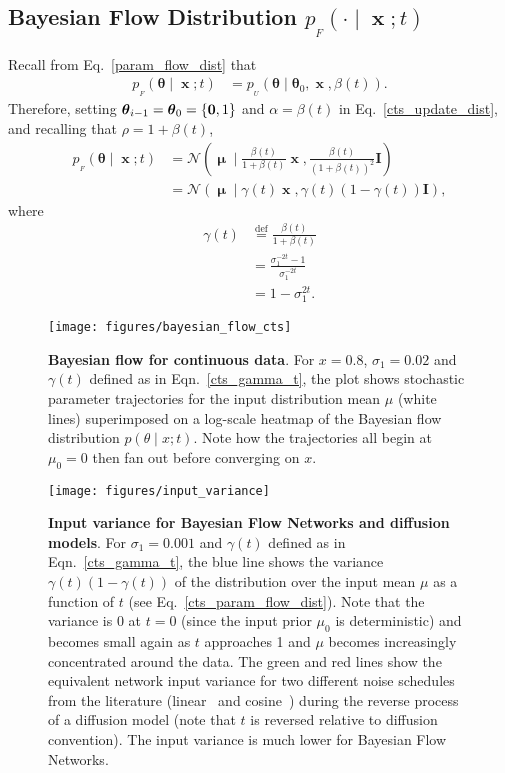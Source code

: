 \documentclass[11pt,table]{article}
\DeclareMathOperator{\x}{\mathbf{x}}
\DeclareMathOperator{\m}{\boldsymbol{\mu}}
\newcommand{\N}[2]{\mathcal{N}\left(#1 , #2\right)}
\newcommand{\I}[1]{\boldsymbol{I}}
\newcommand*{\defeq}{\stackrel{\text{def}}{=}}
\newcommand{\tidx}[2]{#1_{#2}}
\renewcommand{\vec}[1]{\boldsymbol{#1}}
\newcommand{\pars}{\theta}
\newcommand{\parsn}{\vec{\pars}}
\newcommand{\parsnt}[1]{\tidx{\parsn}{#1}}
\newcommand{\0}[1]{\constvec{0}{#1}}
\newcommand{\1}[1]{\constvec{1}{#1}}
\newcommand{\flow}{p_{_F}}
\newcommand{\update}{p_{_U}}
\begin{document}
\subsection{Bayesian Flow Distribution \texorpdfstring{$\flow(\cdot \mid \x; t)$}{}}
Recall from Eq.~\ref{param_flow_dist} that
\begin{align}
\flow(\parsn \mid \x; t) &= \update(\parsn \mid \parsnt{0}, \x, \beta(t)).
\end{align}
Therefore, setting $\parsnt{i-1} = \parsnt{0} = \{\0{D},1\}$ and $\alpha = \beta(t)$ in Eq.~\ref{cts_update_dist}, and recalling that $\rho = 1 + \beta(t)$,
\begin{align}
\flow(\parsn \mid \x; t) &=  \N{\m \mid \frac{\beta(t)}{1+\beta(t)}\x}{\frac{\beta(t)}{(1+\beta(t))^2}\I{D}}\\ 
&= \N{\m \mid \gamma(t)\x}{\gamma(t)(1-\gamma(t))\I{D}},\label{cts_param_flow_dist}
\end{align}
where
\begin{align}
\gamma(t) &\defeq \frac{\beta(t)}{1+\beta(t)}\label{gamma}\\
&= \frac{\sigma_1^{-2t} - 1}{\sigma_1^{-2t}}\\
&= 1 - \sigma_1^{2t}\label{cts_gamma_t}.
\end{align}
\begin{figure}[t!]
\texttt{[image: figures/bayesian\_flow\_cts]}
\caption{\textbf{Bayesian flow for continuous data}. For $x=0.8$, $\sigma_1=0.02$ and $\gamma(t)$ defined as in Eqn.~\ref{cts_gamma_t}, the plot shows stochastic parameter trajectories for the input distribution mean $\mu$ (white lines) superimposed on a log-scale heatmap of the Bayesian flow distribution $p(\theta \mid x; t)$. Note how the trajectories all begin at $\mu_0=0$ then fan out before converging on $x$.}
\label{fig:cts_param_flow}
\end{figure}

\begin{figure}[t]
\centering
\texttt{[image: figures/input\_variance]}
\caption{\textbf{Input variance for Bayesian Flow Networks and diffusion models}. For $\sigma_1=0.001$ and $\gamma(t)$ defined as in Eqn.~\ref{cts_gamma_t}, the blue line shows the variance $\gamma(t)(1-\gamma(t))$ of the distribution over the input mean $\mu$ as a function of $t$ (see Eq.~\ref{cts_param_flow_dist}). Note that the variance is 0 at $t=0$ (since the input prior $\mu_0$ is deterministic) and becomes small again as $t$ approaches 1 and $\mu$ becomes increasingly concentrated around the data. The green and red lines show the equivalent network input variance for two different noise schedules from the literature (linear~\citep{ ho2020denoising} and cosine~\citep{ nichol2021improved}) during the reverse process of a diffusion model (note that $t$ is reversed relative to diffusion convention). The input variance is much lower for Bayesian Flow Networks.}
\end{figure}
\end{document}
